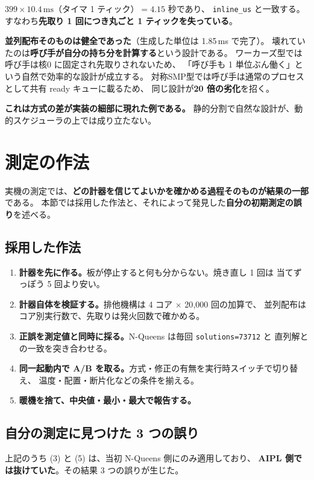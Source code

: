 \documentclass[a4paper,11pt]{ltjsarticle}
\begin{document}
\noindent
$399 \times 10.4\,\mathrm{ms}$（タイマ 1 ティック）$= 4.15$ 秒であり、
\texttt{inline\_us} と一致する。すなわち\textbf{先取り 1 回につき丸ごと 1 ティックを失っている}。

\textbf{並列配布そのものは健全であった}（生成した単位は 1.85\,ms で完了）。
壊れていたのは\textbf{呼び手が自分の持ち分を計算する}という設計である。
ワーカーズ型では呼び手は核0 に固定され先取りされないため、
「呼び手も 1 単位ぶん働く」という自然で効率的な設計が成立する。
対称SMP型では呼び手は通常のプロセスとして共有 ready キューに載るため、
同じ設計が\textbf{20 倍の劣化}を招く。

\textbf{これは方式の差が実装の細部に現れた例である。}
静的分割で自然な設計が、動的スケジューラの上では成り立たない。

\section{測定の作法}\label{sec:method}

実機の測定では、\textbf{どの計器を信じてよいかを確かめる過程そのものが結果の一部}である。
本節では採用した作法と、それによって発見した\textbf{自分の初期測定の誤り}を述べる。

\subsection{採用した作法}
\begin{enumerate}
\item \textbf{計器を先に作る。}板が停止すると何も分からない。焼き直し 1 回は
      当てずっぽう 5 回より安い。
\item \textbf{計器自体を検証する。}排他機構は 4 コア $\times$ 20{,}000 回の加算で、
      並列配布はコア別実行数で、先取りは発火回数で確かめる。
\item \textbf{正誤を測定値と同時に採る。}N-Queens は毎回 \texttt{solutions=73712} と
      直列解との一致を突き合わせる。
\item \textbf{同一起動内で A/B を取る。}方式・修正の有無を実行時スイッチで切り替え、
      温度・配置・断片化などの条件を揃える。
\item \textbf{暖機を捨て、中央値・最小・最大で報告する。}
\end{enumerate}

\subsection{自分の測定に見つけた 3 つの誤り}
上記のうち (3) と (5) は、当初 N-Queens 側にのみ適用しており、
\textbf{AIPL 側では抜けていた}。その結果 3 つの誤りが生じた。
\end{document}
